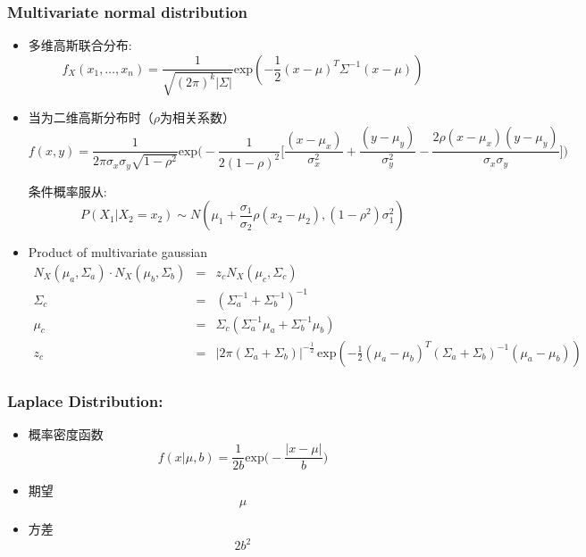 \documentclass{article} 	%
\begin{document}
                \subsubsection{Multivariate normal distribution}
                        \begin{itemize}
                                \item
                                多维高斯联合分布:
                                $$f_X(x_1,\ldots,x_n) = \frac{1}{\sqrt{(2\pi)^k|\Sigma|}}\mathrm{exp}(-\frac{1}{2}(x-\mu)^T\Sigma^{-1}(x-\mu))$$
                                
                                \item
                                当为二维高斯分布时（$\rho$为相关系数）\\
                                $$f(x,y) = \frac{1}{2\pi\sigma_x\sigma_y\sqrt{1-\rho^2}}\mathrm{exp}\Big( -\frac{1}{2(1-\rho)^2} 
                                \Big[\frac{(x-\mu_x)}{\sigma_x^2}+\frac{(y-\mu_y)}{\sigma_y^2} - \frac{2\rho(x-\mu_x)(y-\mu_y)}{\sigma_x\sigma_y}\Big]\Big)$$
                                
                                条件概率服从:
                                $$P(X_1\big|X_2 =x_2)\sim N(\mu_1 +\frac{\sigma_1}{\sigma_2}\rho(x_2-\mu_2),(1-\rho^2)\sigma_1^2)$$
                                \item
                                Product of multivariate gaussian
                                \begin{eqnarray*}
                                    N_X(\mu_a,\Sigma_a)\cdot N_X(\mu_b,\Sigma_b) &=& z_cN_X(\mu_c,\Sigma_c)\\
                                    \Sigma_c &=& (\Sigma_a^{-1}+\Sigma_b^{-1})^{-1}\\
                                    \mu_c &=& \Sigma_c(\Sigma_a^{-1}\mu_a +\Sigma_b^{-1}\mu_b)\\
                                    z_c &=& |2\pi(\Sigma_a+\Sigma_b)|^{-\frac{1}{2}}\,\mathrm{exp} \left(-\frac{1}{2}(\mu_a-\mu_b)^T(\Sigma_a+\Sigma_b)^{-1}(\mu_a-\mu_b)\right)
                                \end{eqnarray*}
	                        \end{itemize}
	        
	        \subsubsection{Laplace Distribution:}
	        		\begin{itemize}
			\item
			概率密度函数\\
			$$f(x|\mu,b)= \displaystyle\frac{1}{2b} \mathrm{exp}\big(-\frac{|x-\mu|}{b}\big)$$
			\item
			期望\\
			$$\mu$$
			\item
			方差\\
			$$2b^2$$
			\end{itemize}
\end{document}
